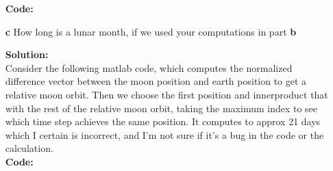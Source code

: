 \documentclass[12pt]{article}
\makeatletter
\theoremstyle{homework}
\newenvironment{exercise}[1]
{\def\@currentlabel{#1}\exercisecore}
{\endexercisecore}
\newcommand{\localhead}[1]{\par\smallskip\noindent\textbf{#1}\nobreak\\}%
\newcommand\solution{\localhead{Solution:}}
\makeatother
\begin{document}
\begin{exercise}{Problem P29}
\begin{enumerate}
    \textbf{Code:}
    \begin{center}
      
    \end{center}    


    \item[\textbf{c}] How long is a lunar month, if we used your computations in part \textbf{b}
    \solution Consider the following matlab code, which computes the normalized difference vector between
    the moon position and earth position to get a relative moon orbit. Then we choose the first position
    and innerproduct that with the rest of the relative moon orbit, taking the maximum index to see which time step
    achieves the same position. It computes to approx 21 days which I certain is incorrect, and I'm not sure if it's a bug in the code 
    or the calculation. \\

    \textbf{Code:}
    \begin{center}
      
    \end{center}    



  \end{enumerate}

  
\end{exercise}
\end{document}
